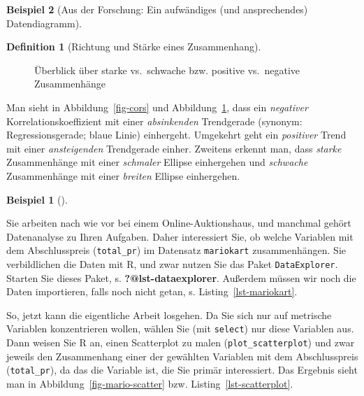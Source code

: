 \documentclass[
  a4paper,
]{scrbook}
\theoremstyle{definition}
\newtheorem{example}{Beispiel}[chapter]
\theoremstyle{definition}
\newtheorem{definition}{Definition}[chapter]
\theoremstyle{definition}
\theoremstyle{remark}
\begin{document}
\begin{example}[Aus der Forschung: Ein aufwändiges (und ansprechendes)
Datendiagramm]
\begin{definition}[Richtung und Stärke eines
Zusammenhang]
\begin{figure}

\caption{\label{fig-cors2}Überblick über starke vs.~schwache bzw.
positive vs.~negative Zusammenhänge}

\end{figure}%

Man sieht in Abbildung~\ref{fig-cors} und Abbildung~\ref{fig-cors2},
dass ein \emph{negativer} Korrelationskoeffizient mit einer
\emph{absinkenden} Trendgerade (synonym: Regressionsgerade; blaue Linie)
einhergeht. Umgekehrt geht ein \emph{positiver} Trend mit einer
\emph{ansteigenden} Trendgerade einher. Zweitens erkennt man, dass
\emph{starke} Zusammenhänge mit einer \emph{schmaler} Ellipse
einhergehen und \emph{schwache} Zusammenhänge mit einer \emph{breiten}
Ellipse einhergehen.

\begin{example}[]\protect\hypertarget{exm-scatter}{}\label{exm-scatter}

Sie arbeiten nach wie vor bei einem Online-Auktionshaus, und manchmal
gehört Datenanalyse zu Ihren Aufgaben. Daher interessiert Sie, ob welche
Variablen mit dem Abschlusspreis (\texttt{total\_pr}) im Datensatz
\texttt{mariokart} zusammenhängen. Sie verbildlichen die Daten mit R,
und zwar nutzen Sie das Paket \texttt{DataExplorer}. Starten Sie dieses
Paket, s. \textbf{?@lst-dataexplorer}. Außerdem müssen wir noch die
Daten importieren, falls noch nicht getan, s.
Listing~\ref{lst-mariokart}.

So, jetzt kann die eigentliche Arbeit losgehen. Da Sie sich nur auf
metrische Variablen konzentrieren wollen, wählen Sie (mit
\texttt{select}) nur diese Variablen aus. Dann weisen Sie R an, einen
Scatterplot zu malen (\texttt{plot\_scatterplot}) und zwar jeweils den
Zusammenhang einer der gewählten Variablen mit dem Abschlusspreis
(\texttt{total\_pr}), da das die Variable ist, die Sie primär
interessiert. Das Ergebnis sieht man in
Abbildung~\ref{fig-mario-scatter} bzw. Listing~\ref{lst-scatterplot}.


\end{example}
\end{definition}
\end{example}
\end{document}
